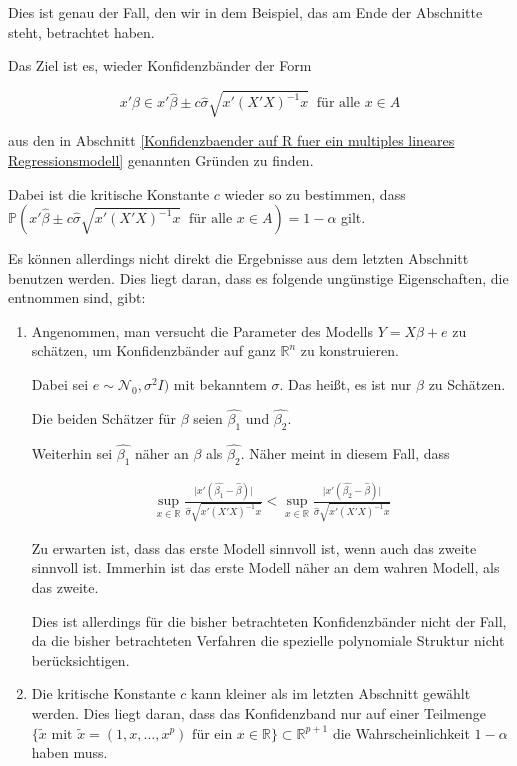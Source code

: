 \documentclass[12pt,a4paper]{article}
\theoremstyle{definition}
\theoremstyle{definition}
\theoremstyle{definition}
\begin{document}
Dies ist genau der Fall, den wir in dem Beispiel, das am Ende der Abschnitte steht, betrachtet haben. 

Das Ziel ist es, wieder Konfidenzbänder der Form 

\begin{equation}
x' \beta \in x' \hat{\beta} \pm c \hat{\sigma} \sqrt{x'(X'X)^{-1}x} ~ \text{ für alle } x \in A
\end{equation}

aus den in Abschnitt \ref{Konfidenzbaender auf R fuer ein multiples lineares Regressionsmodell} genannten Gründen zu  finden. 

Dabei ist die kritische Konstante $c$ wieder so zu bestimmen, dass $\mathbb{P}(x' \hat{\beta} \pm c \hat{\sigma} \sqrt{x'(X'X)^{-1}x} ~ \text{ für alle } x \in A) = 1 - \alpha$ gilt. 

Es können allerdings nicht direkt die Ergebnisse aus dem letzten Abschnitt benutzen werden. Dies liegt daran, dass es  folgende ungünstige Eigenschaften, die \cite[180]{Liu64} entnommen sind, gibt: 

\begin{enumerate}
\item Angenommen, man versucht die Parameter des Modells $Y=X\beta+e$ zu schätzen, um Konfidenzbänder auf ganz $\mathbb{R}^n$ zu konstruieren. 

Dabei sei $e \sim \mathscr{N}_0,\sigma^2 I)$ mit bekanntem $\sigma$. Das heißt, es ist nur $\beta$ zu Schätzen.

Die beiden Schätzer für $\beta$ seien $\hat{\beta_1}$ und $\hat{\beta_2}$. 

Weiterhin sei $\hat{\beta_1}$ näher an $\beta$ als $\hat{\beta_2}$. Näher meint in diesem Fall, dass

\begin{align*}
\sup_{x \in \mathbb{R}} \frac{\vert x'(\hat{\beta_1} - \hat{\beta}) \vert}{\hat{\sigma} \sqrt{x'(X'X)^{-1}x}} < 
\sup_{x \in \mathbb{R}} \frac{\vert x'(\hat{\beta_2} - \hat{\beta}) \vert}{\hat{\sigma} \sqrt{x'(X'X)^{-1}x}}
\end{align*}

Zu erwarten ist, dass das erste Modell sinnvoll ist, wenn auch das zweite sinnvoll ist. Immerhin ist das erste Modell näher an dem wahren Modell, als das zweite.

Dies ist allerdings für die bisher betrachteten Konfidenzbänder nicht der Fall, da die bisher betrachteten Verfahren die spezielle polynomiale Struktur nicht berücksichtigen. 

\item Die kritische Konstante $c$ kann kleiner als im letzten Abschnitt gewählt werden. Dies liegt daran, dass das Konfidenzband nur auf einer Teilmenge $\{ \tilde{x} \text{ mit } \tilde{x}=(1,x,\ldots,x^p) \text{ für ein } x \in \mathbb{R}\} \subset \mathbb{R}^{p+1}$ die Wahrscheinlichkeit $1-\alpha$ haben muss.
\end{enumerate}
\end{document}
